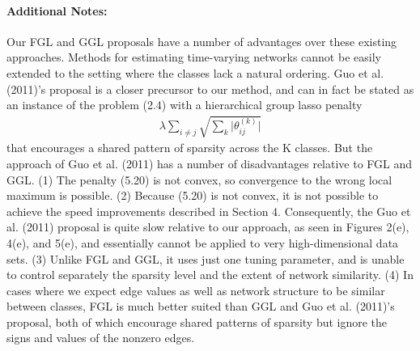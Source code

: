 \documentclass[12pt, leqno]{article}
\providecommand{\abs}[1]{\lvert#1\rvert}
\begin{document}
\pagebreak
\paragraph{Additional Notes:}
Our FGL and GGL proposals have a number of advantages over these
existing approaches. Methods for estimating time-varying networks
cannot be easily extended to the setting where the classes lack a
natural ordering. Guo et al. (2011)’s proposal is a closer precursor
to our method, and can in fact be stated as an instance of the problem
(2.4) with a hierarchical group lasso penalty
\begin{align*}
  \lambda \sum_{i\not=j} \sqrt{\sum_k \abs{\theta_{ij}^{(k)}}}
\end{align*}
that encourages a shared pattern of sparsity across the K classes. But
the approach of Guo et al. (2011) has a number of disadvantages
relative to FGL and GGL. 
(1) The penalty (5.20) is not convex, so convergence to the wrong
local maximum is possible.
(2) Because (5.20) is not convex, it is not possible to achieve the
speed improvements described in Section 4. 
Consequently, the Guo et al. (2011) proposal is quite slow relative to
our approach, as seen in Figures 2(e), 4(e), and 5(e), and essentially
cannot be applied to very high-dimensional data sets. 
(3) Unlike FGL and GGL, it uses just one tuning parameter, and is
unable to control separately the sparsity level and the extent of
network similarity. 
(4) In cases where we expect edge values as well as network structure
to be similar between classes, FGL is much better suited than GGL and
Guo et al. (2011)’s proposal, both of which encourage shared patterns
of sparsity but ignore the signs and values of the nonzero edges.
\end{document}
